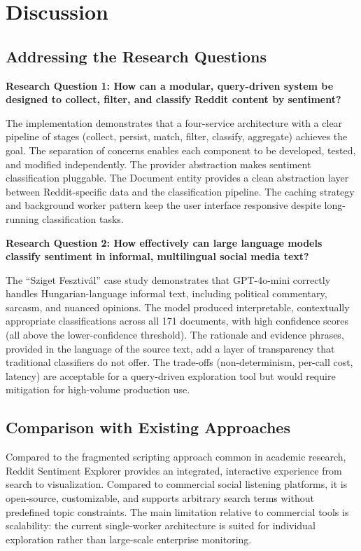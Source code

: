 \section{Discussion}
\label{sec:discussion}

\subsection{Addressing the Research Questions}

\textbf{Research Question 1: How can a modular, query-driven system be designed to collect, filter, and classify Reddit content by sentiment?}

The implementation demonstrates that a four-service architecture with a clear pipeline of stages (collect, persist, match, filter, classify, aggregate) achieves the goal. The separation of concerns enables each component to be developed, tested, and modified independently. The provider abstraction makes sentiment classification pluggable. The Document entity provides a clean abstraction layer between Reddit-specific data and the classification pipeline. The caching strategy and background worker pattern keep the user interface responsive despite long-running classification tasks.

\textbf{Research Question 2: How effectively can large language models classify sentiment in informal, multilingual social media text?}

The ``Sziget Fesztiv\'{a}l'' case study demonstrates that GPT-4o-mini correctly handles Hungarian-language informal text, including political commentary, sarcasm, and nuanced opinions. The model produced interpretable, contextually appropriate classifications across all 171 documents, with high confidence scores (all above the lower-confidence threshold). The rationale and evidence phrases, provided in the language of the source text, add a layer of transparency that traditional classifiers do not offer. The trade-offs (non-determinism, per-call cost, latency) are acceptable for a query-driven exploration tool but would require mitigation for high-volume production use.

\subsection{Comparison with Existing Approaches}

\begin{sloppypar}
Compared to the fragmented scripting approach common in academic research, Reddit Sentiment Explorer provides an integrated, interactive experience from search to visualization. Compared to commercial social listening platforms, it is open-source, customizable, and supports arbitrary search terms without predefined topic constraints. The main limitation relative to commercial tools is scalability: the current single-worker architecture is suited for individual exploration rather than large-scale enterprise monitoring.
\end{sloppypar}
